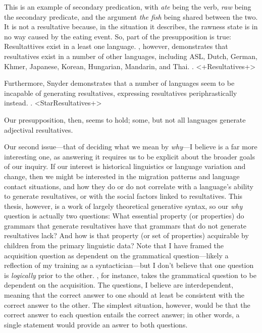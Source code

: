 \documentclass[MilwayThesis]{subfiles}
\begin{document}
This is an example of secondary predication, with \textit{ate} being the verb, \textit{raw} being the secondary predicate, and the argument \textit{the fish} being shared between the two.
It is not a resultative because, in the situation it describes, the rawness state is in no way caused by the eating event.
So, part of the presupposition is true: Resultattives exist in a least one language.
\textcite{snyder1995language,snyder2001nature}, however, demonstrates that resultatives exist in a number of other languages, including ASL, Dutch, German, Khmer, Japanese, Korean, Hungarian, Mandarin, and Thai.
\ex. <+Resultatives+>

Furthermore, Snyder demonstrates that a number of languages seem to be incapable of generating resultatives, expressing resultatives periphrastically instead.
\ex. <StarResultatives+>

Our presupposition, then, seems to hold; some, but not all languages generate adjectival resultatives.

Our second issue---that of deciding what we mean by \textit{why}---I believe is a far more interesting one, as answering it requires us to be explicit about the broader goals of our inquiry.
If our interest is historical linguistics or language variation and change, then we might be interested in the migration patterns and language contact situations, and how they do or do not correlate with a language's ability to generate resultatives, or with the social factors linked to resultatives.
This thesis, however, is a work of largely theoretical generative syntax, so our \textit{why} question is actually two questions: What essential property (or properties) do grammars that generate resultatives have that grammars that do not generate resultatives lack? And how is that property (or set of properties) acquirable by children from the primary linguistic data?
Note that I have framed the acquisition question as dependent on the grammatical question---likely a reflection of my training as a syntactician---but I don't believe that one question is \textit{logically} prior to the other.
\textcite{snyder1995language,snyder2001nature}, for instance, takes the grammatical question to be dependent on the acquisition.
The questions, I believe are interdependent, meaning that the correct answer to one should at least be consistent with the correct answer to the other.
The simplest situation, however, would be that the correct answer to each question entails the correct answer; in other words, a single statement would provide an aswer to both questions.
\end{document}
